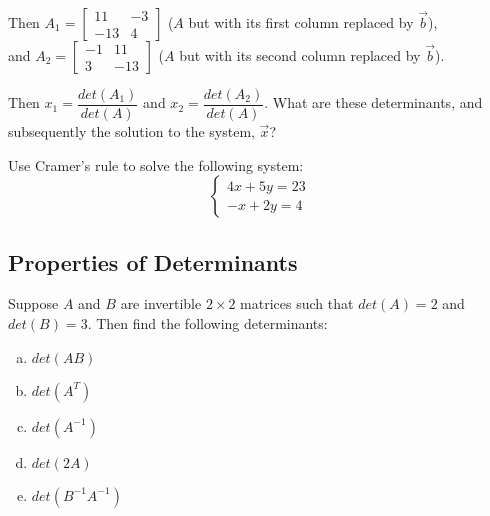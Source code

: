 \documentclass[11pt]{exam}
\begin{document}
    Then $A_1 = \begin{bmatrix} 11 & -3 \\ -13 & 4 \end{bmatrix}$ ($A$ but with its first column replaced by $\vec{b}$), \\
    and $A_2 = \begin{bmatrix} -1 & 11 \\ 3 & -13 \end{bmatrix}$ ($A$ but with its second column replaced by $\vec{b}$).

    Then $x_1 = \dfrac{det(A_1)}{det(A)}$ and $x_2 = \dfrac{det(A_2)}{det(A)}$. What are these determinants, and subsequently the solution to the
    system, $\vec{x}$?

    \vspace{20px}
    \begin{questions}
        \item Use Cramer's rule to solve the following system:
        $$\begin{cases}
            4x + 5y = 23 \\
            -x + 2y = 4
        \end{cases}$$
    \end{questions}

    \vspace{20px}
    \subsection{Properties of Determinants}
    \begin{questions}
        \item Suppose $A$ and $B$ are invertible $2 \times 2$ matrices such that $det(A) = 2$ and $det(B) = 3$. Then find the following determinants:
        \begin{enumerate}[a.]
            \item $det(AB)$
            \item $det(A^T)$
            \item $det(A^{-1})$
            \item $det(2A)$
            \item $det(B^{-1}A^{-1})$
        \end{enumerate}
    \end{questions}
\end{document}
